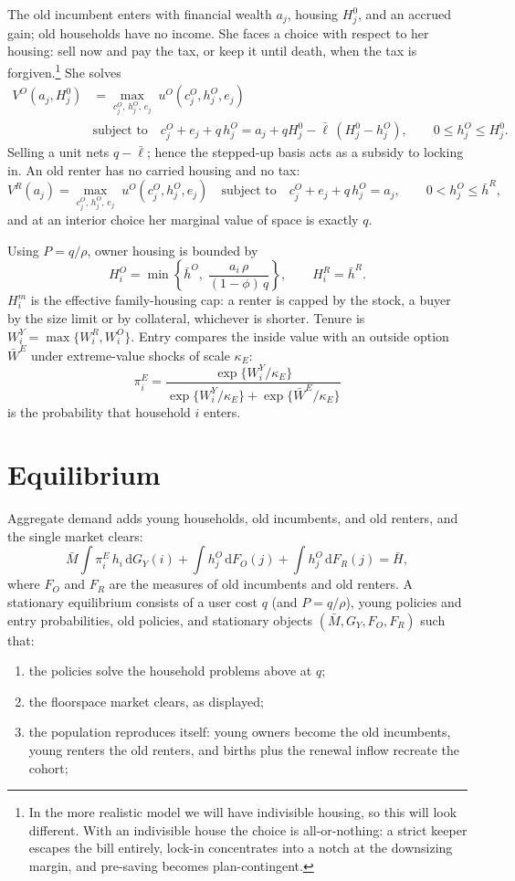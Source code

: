 \documentclass[11pt]{article}
\newcommand{\dd}{\mathrm d}
\begin{document}
The old incumbent enters with financial wealth $a_j$, housing $H_j^0$, and an accrued gain; old households have no income. She faces a choice with respect to her housing: sell now and pay the tax, or keep it until death, when the tax is forgiven.\footnote{In the more realistic model we will have indivisible housing, so this will look different. With an indivisible house the choice is all-or-nothing: a strict keeper escapes the bill entirely, lock-in concentrates into a notch at the downsizing margin, and pre-saving becomes plan-contingent.} She solves
\[
\begin{aligned}
V^O(a_j,H_j^0)
&=\max_{c_j^O,\,h_j^O,\,e_j}\;u^O(c_j^O,h_j^O,e_j)
\\
&\text{subject to}\quad
c_j^O+e_j+q\,h_j^O=a_j+qH_j^0-\bar\ell\,(H_j^0-h_j^O),
\qquad
0\le h_j^O\le H_j^0 .
\end{aligned}
\]
Selling a unit nets $q-\bar\ell$; hence the stepped-up basis acts as a subsidy to locking in. An old renter has no carried housing and no tax:
\[
V^R(a_j)
=\max_{c_j^O,\,h_j^O,\,e_j}\;u^O(c_j^O,h_j^O,e_j)
\quad\text{subject to}\quad
c_j^O+e_j+q\,h_j^O=a_j,
\qquad
0<h_j^O\le\bar h^R ,
\]
and at an interior choice her marginal value of space is exactly $q$.

Using $P=q/\rho$, owner housing is bounded by
\[
H_i^O=\min\left\{\bar h^O,\;\frac{a_i\,\rho}{(1-\phi)\,q}\right\},
\qquad
H_i^R=\bar h^R .
\]
$H_i^m$ is the effective family-housing cap: a renter is capped by the stock, a buyer by the size limit or by collateral, whichever is shorter. Tenure is $W_i^Y=\max\{W_i^R,W_i^O\}$. Entry compares the inside value with an outside option $\bar W^E$ under extreme-value shocks of scale $\kappa_E$:
\[
\pi_i^E=\frac{\exp\{W_i^Y/\kappa_E\}}{\exp\{W_i^Y/\kappa_E\}+\exp\{\bar W^E/\kappa_E\}}
\]
is the probability that household $i$ enters.

\section{Equilibrium}

Aggregate demand adds young households, old incumbents, and old renters, and the single market clears:
\[
\bar M\int\pi_i^E\,h_i\,\dd G_Y(i)+\int h_j^O\,\dd F_O(j)+\int h_j^O\,\dd F_R(j)=\bar H ,
\]
where $F_O$ and $F_R$ are the measures of old incumbents and old renters.
A stationary equilibrium consists of a user cost $q$ (and $P=q/\rho$), young policies and entry probabilities, old policies, and stationary objects $(\bar M,G_Y,F_O,F_R)$ such that:
\begin{enumerate}
\item the policies solve the household problems above at $q$;
\item the floorspace market clears, as displayed;
\item the population reproduces itself: young owners become the old incumbents, young renters the old renters, and births plus the renewal inflow recreate the cohort;
\end{enumerate}
\end{document}
